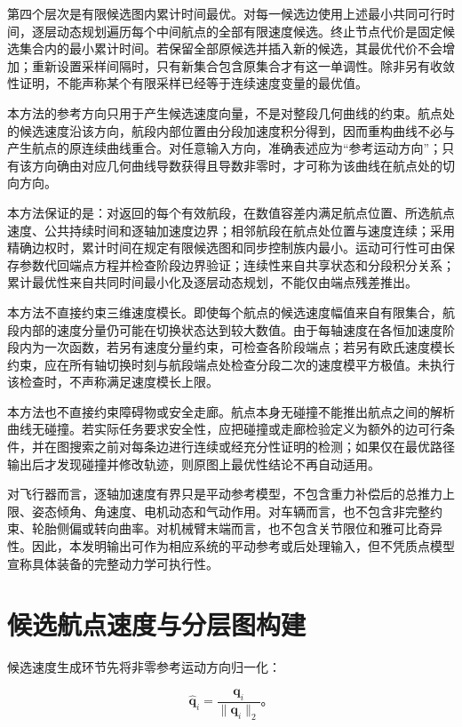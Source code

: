 \documentclass[UTF8,a4paper,12pt,fontset=fandol]{ctexart}
\begin{document}
第四个层次是有限候选图内累计时间最优。对每一候选边使用上述最小共同可行时间，逐层动态规划遍历每个中间航点的全部有限速度候选。终止节点代价是固定候选集合内的最小累计时间。若保留全部原候选并插入新的候选，其最优代价不会增加；重新设置采样间隔时，只有新集合包含原集合才有这一单调性。除非另有收敛性证明，不能声称某个有限采样已经等于连续速度变量的最优值。

本方法的参考方向只用于产生候选速度向量，不是对整段几何曲线的约束。航点处的候选速度沿该方向，航段内部位置由分段加速度积分得到，因而重构曲线不必与产生航点的原连续曲线重合。对任意输入方向，准确表述应为“参考运动方向”；只有该方向确由对应几何曲线导数获得且导数非零时，才可称为该曲线在航点处的切向方向。

本方法保证的是：对返回的每个有效航段，在数值容差内满足航点位置、所选航点速度、公共持续时间和逐轴加速度边界；相邻航段在航点处位置与速度连续；采用精确边权时，累计时间在规定有限候选图和同步控制族内最小。运动可行性可由保存参数代回端点方程并检查阶段边界验证；连续性来自共享状态和分段积分关系；累计最优性来自共同时间最小化及逐层动态规划，不能仅由端点残差推出。

本方法不直接约束三维速度模长。即使每个航点的候选速度幅值来自有限集合，航段内部的速度分量仍可能在切换状态达到较大数值。由于每轴速度在各恒加速度阶段内为一次函数，若另有速度分量约束，可检查各阶段端点；若另有欧氏速度模长约束，应在所有轴切换时刻与航段端点处检查分段二次的速度模平方极值。未执行该检查时，不声称满足速度模长上限。

本方法也不直接约束障碍物或安全走廊。航点本身无碰撞不能推出航点之间的解析曲线无碰撞。若实际任务要求安全性，应把碰撞或走廊检验定义为额外的边可行条件，并在图搜索之前对每条边进行连续或经充分性证明的检测；如果仅在最优路径输出后才发现碰撞并修改轨迹，则原图上最优性结论不再自动适用。

对飞行器而言，逐轴加速度有界只是平动参考模型，不包含重力补偿后的总推力上限、姿态倾角、角速度、电机动态和气动作用。对车辆而言，也不包含非完整约束、轮胎侧偏或转向曲率。对机械臂末端而言，也不包含关节限位和雅可比奇异性。因此，本发明输出可作为相应系统的平动参考或后处理输入，但不凭质点模型宣称具体装备的完整动力学可执行性。

\section{候选航点速度与分层图构建}

候选速度生成环节先将非零参考运动方向归一化：

\[
\widehat{\mathbf q}_i=\frac{\mathbf q_i}{\|\mathbf q_i\|_2}\text{。}
\]
\end{document}
